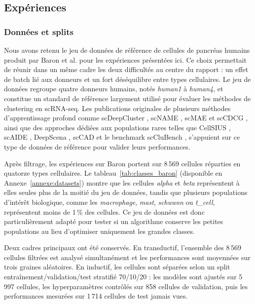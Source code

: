 \subsection{Expériences}

\subsubsection{Données et splits}

Nous avons retenu le jeu de données de référence de cellules de pancréas humains produit par Baron et al. \cite{Baron2016} pour les expériences présentées ici. Ce choix permettait de réunir dans un même cadre les deux difficultés au centre du rapport : un effet de batch lié aux donneurs et un fort déséquilibre entre types cellulaires. Le jeu de données regroupe quatre donneurs humains, notés \textit{human1} à \textit{human4}, et constitue un standard de référence largement utilisé pour évaluer les méthodes de clustering en scRNA-seq. Les publications originales de plusieurs méthodes d'apprentissage profond comme scDeepCluster \cite{tian2019clustering}, scNAME \cite{wan_scname_2022}, scMAE \cite{Fang2024scMAE} et scCDCG \cite{xu_sccdcg_2025}, ainsi que des approches dédiées aux populations rares telles que CellSIUS \cite{Neri2019}, scAIDE \cite{scAIDE2020}, DeepScena \cite{Lei2023scHDR}, scCAD \cite{Xu2024scCAD} et le benchmark scCluBench \cite{xu_scclubench_2026}, s'appuient sur ce type de données de référence pour valider leurs performances.

Après filtrage, les expériences sur Baron portent sur 8\,569 cellules réparties en quatorze types cellulaires. Le tableau~\ref{tab:classes_baron} (disponible en Annexe~\ref{annexe:datasets}) montre que les cellules \textit{alpha} et \textit{beta} représentent à elles seules plus de la moitié du jeu de données, tandis que plusieurs populations d'intérêt biologique, comme les \textit{macrophage}, \textit{mast}, \textit{schwann} ou \textit{t\_cell}, représentent moins de 1\,\% des cellules. Ce jeu de données est donc particulièrement adapté pour tester si un algorithme conserve les petites populations au lieu d'optimiser uniquement les grandes classes.

Deux cadres principaux ont été conservés. En transductif, l'ensemble des 8\,569 cellules filtrées est analysé simultanément et les performances sont moyennées sur trois graines aléatoires. En inductif, les cellules sont séparées selon un split entraînement/validation/test stratifié 70/10/20 : les modèles sont ajustés sur 5\,997 cellules, les hyperparamètres contrôlés sur 858 cellules de validation, puis les performances mesurées sur 1\,714 cellules de test jamais vues.

